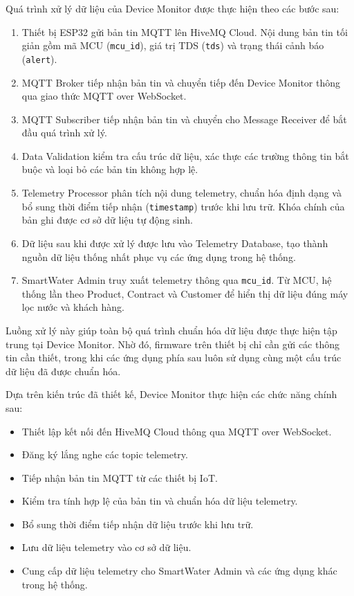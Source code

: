 
Quá trình xử lý dữ liệu của Device Monitor được thực hiện theo các bước sau:

\begin{enumerate}
    \item Thiết bị ESP32 gửi bản tin MQTT lên HiveMQ Cloud. Nội dung bản tin tối giản gồm mã MCU (\texttt{mcu\_id}), giá trị TDS (\texttt{tds}) và trạng thái cảnh báo (\texttt{alert}).

    \item MQTT Broker tiếp nhận bản tin và chuyển tiếp đến Device Monitor thông qua giao thức MQTT over WebSocket.

    \item MQTT Subscriber tiếp nhận bản tin và chuyển cho Message Receiver để bắt đầu quá trình xử lý.

    \item Data Validation kiểm tra cấu trúc dữ liệu, xác thực các trường thông tin bắt buộc và loại bỏ các bản tin không hợp lệ.

    \item Telemetry Processor phân tích nội dung telemetry, chuẩn hóa định dạng và bổ sung thời điểm tiếp nhận (\texttt{timestamp}) trước khi lưu trữ. Khóa chính của bản ghi được cơ sở dữ liệu tự động sinh.

    \item Dữ liệu sau khi được xử lý được lưu vào Telemetry Database, tạo thành nguồn dữ liệu thống nhất phục vụ các ứng dụng trong hệ thống.

    \item SmartWater Admin truy xuất telemetry thông qua \texttt{mcu\_id}. Từ MCU, hệ thống lần theo Product, Contract và Customer để hiển thị dữ liệu đúng máy lọc nước và khách hàng.
\end{enumerate}

Luồng xử lý này giúp toàn bộ quá trình chuẩn hóa dữ liệu được thực hiện tập trung tại Device Monitor. Nhờ đó, firmware trên thiết bị chỉ cần gửi các thông tin cần thiết, trong khi các ứng dụng phía sau luôn sử dụng cùng một cấu trúc dữ liệu đã được chuẩn hóa.


Dựa trên kiến trúc đã thiết kế, Device Monitor thực hiện các chức năng chính sau:

\begin{itemize}
    \item Thiết lập kết nối đến HiveMQ Cloud thông qua MQTT over WebSocket.
    \item Đăng ký lắng nghe các topic telemetry.
    \item Tiếp nhận bản tin MQTT từ các thiết bị IoT.
    \item Kiểm tra tính hợp lệ của bản tin và chuẩn hóa dữ liệu telemetry.
    \item Bổ sung thời điểm tiếp nhận dữ liệu trước khi lưu trữ.
    \item Lưu dữ liệu telemetry vào cơ sở dữ liệu.
    \item Cung cấp dữ liệu telemetry cho SmartWater Admin và các ứng dụng khác trong hệ thống.
\end{itemize}

